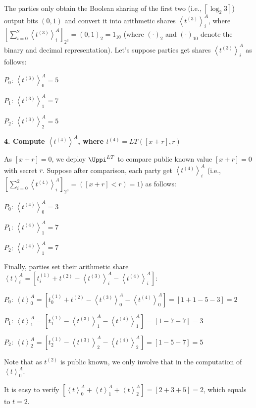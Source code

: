 The parties only obtain the Boolean sharing of the first two (i.e., $\left\lceil \log_2 3\right\rceil $) output bits $\left(0,1\right) $ and convert it into arithmetic shares $\left\langle t^{\left(3\right) }\right\rangle^A_i$, where $\left[\sum_{i=0}^{2} \left\langle t^{\left(3\right) }\right\rangle^A_i\right] _{2^3}=\left(0,1\right)_2=1_{10} $ (where $\left(\cdot\right)_2 $ and $\left(\cdot\right)_{10} $ denote the binary and decimal representation).
Let's suppose parties get shares $\left\langle t^{\left(3\right) }\right\rangle^A_i$ as follows:

$P_0$: $\left\langle t^{\left(3\right) }\right\rangle^A_0=5$

$P_1$: $\left\langle t^{\left(3\right) }\right\rangle^A_1=7$

$P_2$: $\left\langle t^{\left(3\right) }\right\rangle^A_2=5$

\textbf{4. Compute $\left\langle t^{\left(4\right) }\right\rangle^A $, where $t^{\left(4\right) }=LT\left(\left[x+r  \right] ,  r  \right) $}

As $\left[x+r  \right] =0$, we deploy $\Uppi^{LT}$ to compare public known value $\left[x+r  \right] =0$ with secret $r$.
Suppose after comparison, each party get $\left\langle t^{\left(4\right) }\right\rangle^A_i $ (i.e., $\left[\sum_{i=0}^{2}  \left\langle t^{\left(4\right) }\right\rangle^A_i\right] _{2^{3}} =\left(\left[x+r  \right]<r\right) =1$) as follows:

$P_0$: $\left\langle t^{\left(4\right) }\right\rangle^A_0 =3$

$P_1$: $\left\langle t^{\left(4\right) }\right\rangle^A_1= 7$

$P_2$: $\left\langle t^{\left(4\right) }\right\rangle^A_1= 7$

Finally, parties set their arithmetic share $\left\langle t\right\rangle^A_i =\left[t^{(1)}_i+t^{\left(2\right) }-\left\langle t^{(3)}\right\rangle^A_i-\left\langle t^{(4)}\right\rangle^A_i \right] $:

$P_0$: $\left\langle t\right\rangle^A_0= \left[t^{(1)}_0+t^{\left(2\right) }-\left\langle t^{(3)}\right\rangle^A_0-\left\langle t^{(4)}\right\rangle^A_0\right] =\left[1+1-5-3\right] =2$

$P_1$: $\left\langle t\right\rangle^A_1= \left[t^{(1)}_1-\left\langle t^{(3)}\right\rangle^A_1-\left\langle t^{(4)}\right\rangle^A_1\right] =\left[1-7-7\right] =3$

$P_2$: $\left\langle t\right\rangle^A_2= \left[t^{(1)}_2-\left\langle t^{(3)}\right\rangle^A_2-\left\langle t^{(4)}\right\rangle^A_2\right]   =\left[1-5-7\right]=5 $

Note that as $t^{\left(2\right) }$ is public known, we only involve that in the computation of $\left\langle t\right\rangle^A_0$.

It is easy to verify $\left[\left\langle t\right\rangle^A_0+\left\langle t\right\rangle^A_1+\left\langle t\right\rangle^A_2\right]=\left[2+3+5\right] =2 $, which equals to $t=2$.